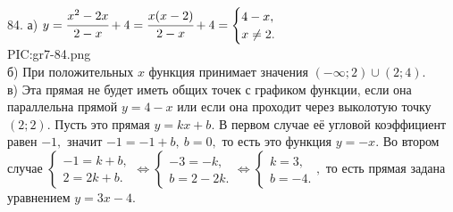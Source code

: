 84. а) $y=\cfrac{x^2-2x}{2-x}+4=\cfrac{x(x-2)}{2-x}+4=\begin{cases} 4-x,\\ x\neq 2.\end{cases}$\\
{{PIC:gr7-84.png}}\\
б) При положительных $x$ функция принимает значения $(-\infty;2)\cup(2;4).$\\
в) Эта прямая не будет иметь общих точек с графиком функции, если она параллельна прямой $y=4-x$ или если она проходит через выколотую точку $(2;2).$ Пусть это прямая $y=kx+b.$ В первом случае её угловой коэффициент равен $-1,$ значит $-1=-1+b,\ b=0,$ то есть это функция $y=-x.$ Во втором случае $\begin{cases} -1=k+b,\\ 2=2k+b.\end{cases}\Leftrightarrow
\begin{cases} -3=-k,\\ b=2-2k.\end{cases}\Leftrightarrow
\begin{cases} k=3,\\ b=-4.\end{cases},$ то есть прямая задана уравнением $y=3x-4.$\newpage\noindent
